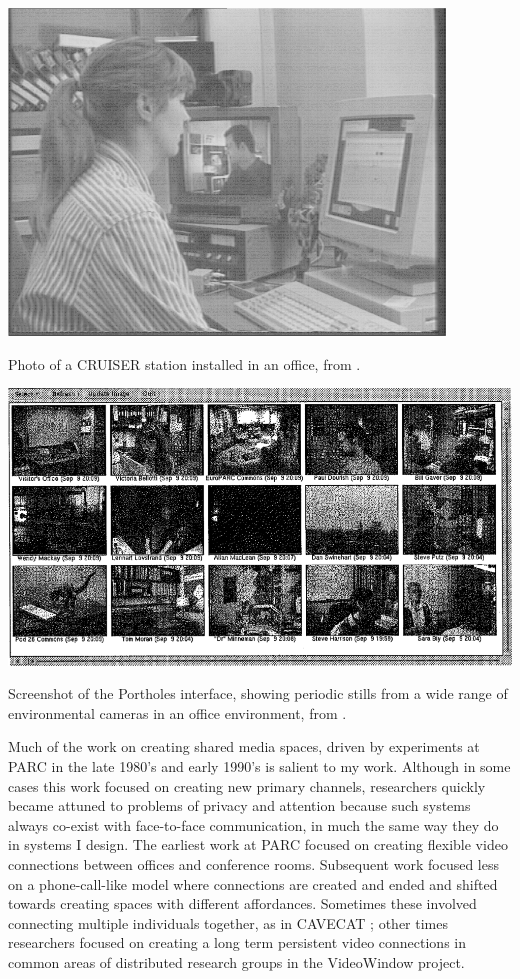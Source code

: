 \documentclass{tufte-handout}
\begin{document}
\begin{marginfigure}
	\includegraphics{figures/CRUISER.png}
	\caption{Photo of a CRUISER station installed in an office, from \citep{Fish:1992vz}.}
	\label{fig:cruiser}
\end{marginfigure}

\begin{marginfigure}
	\includegraphics{figures/portholes.png}
	\caption{Screenshot of the Portholes interface, showing periodic stills from a wide range of environmental cameras in an office environment, from \citep{Dourish:1992fu}.}
	\label{fig:portholes}
\end{marginfigure}


Much of the work on creating shared media spaces, driven by experiments at PARC in the late 1980's and early 1990's is salient to my work. Although in some cases this work focused on creating new primary channels, researchers quickly became attuned to problems of privacy and attention because such systems always co-exist with face-to-face communication, in much the same way they do in systems I design. The earliest work at PARC \citep{Olson:1991vz} focused on creating flexible video connections between offices and conference rooms. Subsequent work focused less on a phone-call-like model where connections are created and ended and shifted towards creating spaces with different affordances. Sometimes these involved connecting multiple individuals together, as in CAVECAT \citep{Mantei:1991ww}; other times researchers focused on creating a long term persistent video connections in common areas of distributed research groups in the VideoWindow \citep{Fish:1990fn} project.
\end{document}
